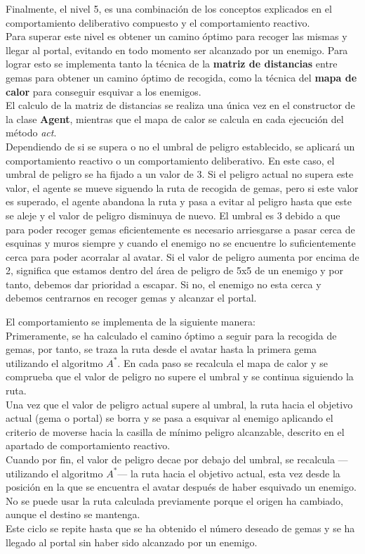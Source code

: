 Finalmente, el nivel 5, es una combinación de los conceptos explicados en el comportamiento deliberativo compuesto y el comportamiento reactivo.\\
Para superar este nivel es obtener un camino óptimo para recoger las mismas y llegar al portal, evitando en todo momento ser alcanzado por un enemigo. Para lograr esto se implementa tanto la técnica de la \textbf{matriz de distancias} entre gemas para obtener un camino óptimo de recogida, como la técnica del \textbf{mapa de calor} para conseguir esquivar a los enemigos.\\
El calculo de la matriz de distancias se realiza una única vez en el constructor de la clase \textbf{Agent}, mientras que el mapa de calor se calcula en cada ejecución del método \emph{act}.\\

Dependiendo de si se supera o no el umbral de peligro establecido, se aplicará un comportamiento reactivo o un comportamiento deliberativo. En este caso, el umbral de peligro se ha fijado a un valor de 3. Si el peligro actual no supera este valor, el agente se mueve siguendo la ruta de recogida de gemas, pero si este valor es superado, el agente abandona la ruta y pasa a evitar al peligro hasta que este se aleje y el valor de peligro disminuya de nuevo. El umbral es 3 debido a que para poder recoger gemas eficientemente es necesario arriesgarse a pasar cerca de esquinas y muros siempre y cuando el enemigo no se encuentre lo suficientemente cerca para poder acorralar al avatar. Si el valor de peligro aumenta por encima de 2, significa que estamos dentro del área de peligro de 5x5 de un enemigo y por tanto, debemos dar prioridad a escapar. Si no, el enemigo no esta cerca y debemos centrarnos en recoger gemas y alcanzar el portal.

El comportamiento se implementa de la siguiente manera:\\
Primeramente, se ha calculado el camino óptimo a seguir para la recogida de gemas, por tanto, se traza la ruta desde el avatar hasta la primera gema utilizando el algoritmo $ A^{*} $. En cada paso se recalcula el mapa de calor y se comprueba que el valor de peligro no supere el umbral y se continua siguiendo la ruta.\\
Una vez que el valor de peligro actual supere al umbral, la ruta hacia el objetivo actual (gema o portal) se borra y se pasa a esquivar al enemigo aplicando el criterio de moverse hacia la casilla de mínimo peligro alcanzable, descrito en el apartado de comportamiento reactivo.\\
Cuando por fin, el valor de peligro decae por debajo del umbral, se recalcula ---utilizando el algoritmo $ A^{*} $--- la ruta hacia el objetivo actual, esta vez desde la posición en la que se encuentra el avatar después de haber esquivado un enemigo. No se puede usar la ruta calculada previamente porque el origen ha cambiado, aunque el destino se mantenga.\\

Este ciclo se repite hasta que se ha obtenido el número deseado de gemas y se ha llegado al portal sin haber sido alcanzado por un enemigo.
